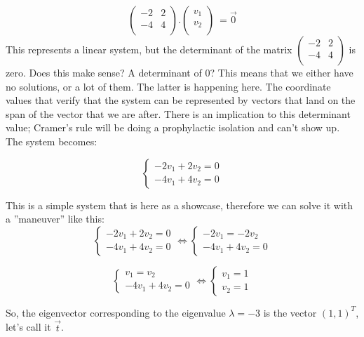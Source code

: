 \documentclass[a4,12pt,twosided,openany]{memoir}
\begin{document}
\[\begin{pmatrix}
-2 & 2  \\
-4 & 4 \\
\end{pmatrix} .\begin{pmatrix}
 v_1\\
v_2\\
\end{pmatrix} \ = \overrightarrow{0} \]
This represents a linear system, but the determinant of the matrix $\begin{pmatrix}
-2 & 2  \\
-4 & 4 \\
\end{pmatrix}$ is zero. Does this make sense? A determinant of 0? This means that we either have no solutions, or a lot of them. The latter is happening here. The coordinate values that verify that the system can be represented by vectors that land on the span of the vector that we are after. There is an implication to this determinant value; Cramer’s rule will be doing a prophylactic isolation and can’t show up. The system becomes:

\[
    \begin{cases}
      -2v_1 + 2v_2  = 0\\
      -4v_1 + 4v_2 = 0
    \end{cases}
\]
\par 
\indent
This is a simple system that is here as a showcase, therefore we can solve it with a ”maneuver” like this:
\[
    \begin{cases}
     -2v_1 + 2v_2  = 0\\
     -4v_1 + 4v_2 = 0
    \end{cases}
  \Leftrightarrow
    \begin{cases}
     -2v_1 = -2v_2  \\
     -4v_1 + 4v_2 = 0
    \end{cases}
\]

\[
    \begin{cases}
     v_1 = v_2 \\
     -4v_1 + 4v_2 = 0
    \end{cases}
  \Leftrightarrow
    \begin{cases}
     v_1 = 1 \\
     v_2 = 1
    \end{cases}
\]
\par 
\indent
So, the eigenvector corresponding to the eigenvalue  $\lambda = -3$ is the vector $(1,1)^T$, let’s call it $\overrightarrow{t}$.
\end{document}
